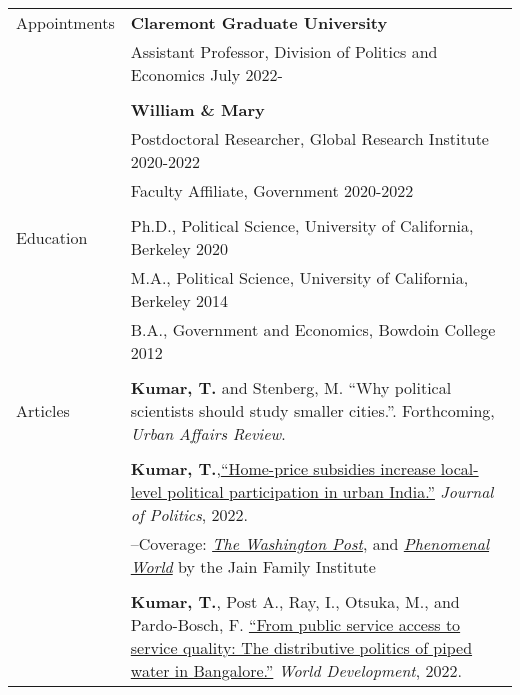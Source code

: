 \documentclass[letterpaper, 10pt]{article}
\begin{document}
\begin{longtable}{p{1in}p{5.5in}}

Appointments 
& \textbf{Claremont Graduate University} \hfill  \\
& Assistant Professor, Division of Politics and Economics \hfill July 2022-\\

& \\

& \textbf{William \& Mary} \hfill \\
& Postdoctoral Researcher, Global Research Institute \hfill 2020-2022 \\
& Faculty Affiliate, Government \hfill 2020-2022 \\

& \\



{Education} 
&Ph.D., Political Science, University of California, Berkeley \hfill 2020 \\


& M.A., Political Science, University of California, Berkeley \hfill 2014 \\
& B.A., Government and Economics, Bowdoin College  \hfill 2012 \\

& \\
\nohyphens{{Articles}} 
& \textbf{Kumar, T.} and Stenberg, M. ``Why political scientists should study smaller cities.''. Forthcoming, \textit{Urban Affairs Review}. \\
& \\
& \textbf{Kumar, T.},\href{https://doi.org/10.1086/715605}{``Home-price subsidies increase local-level political participation in urban India.''} \textit{Journal of Politics}, 2022.\\
& --\indent Coverage: \href{https://www.washingtonpost.com/news/monkey-cage/wp/2019/01/31/heres-what-gavin-newsom-elizabeth-warren-and-microsoft-should-know-if-want-to-end-the-affordable-housing-crisis/?tid=sm_tw_cage}{\textit{The Washington Post}}, and \href{https://www.phenomenalworld.org/sources/original-and-forgery/}{\textit{Phenomenal World}} by the Jain Family Institute  \\
& \\



& \textbf{Kumar, T.}, Post A., Ray, I., Otsuka, M., and Pardo-Bosch, F. \href{https://doi.org/10.1016/j.worlddev.2021.105736}{``From public service access to service quality: The distributive politics of piped water in Bangalore.''} \textit{World Development}, 2022. \\


\end{longtable}
\end{document}
